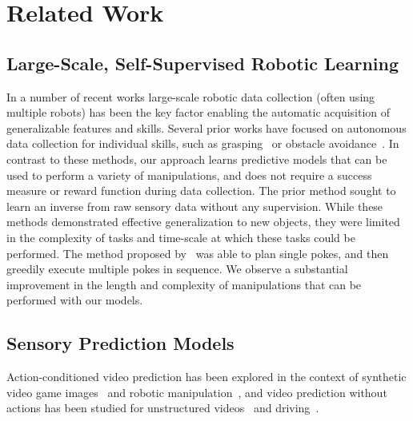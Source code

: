 \section{Related Work}\label{sec:rel_work}

\subsection{Large-Scale, Self-Supervised Robotic Learning}

In a number of recent works large-scale robotic data collection (often using multiple robots) has been the key factor enabling the automatic acquisition of generalizable features and skills. Several prior works have focused on autonomous data collection for individual skills, such as grasping~\cite{lerrel,google_handeye} or obstacle avoidance~\cite{greg_kahn_uncertainty,crashing}. In contrast to these methods, our approach learns predictive models that can be used to perform a variety of manipulations, and does not require a success measure or reward function during data collection. The prior method \cite{pulkit} sought to learn an inverse from raw sensory data without any supervision.
While these methods demonstrated effective generalization to new objects, they were limited in the complexity of tasks and time-scale at which these tasks could be performed. The method proposed by~\cite{pulkit} was able to plan single pokes, and then greedily execute multiple pokes in sequence. We observe a substantial improvement in the length and complexity of manipulations that can be performed with our models.

\subsection{Sensory Prediction Models}

Action-conditioned video prediction has been explored in the context of synthetic video game images~\cite{atarioh,recurrentsimulators} and robotic manipulation~\cite{bootsetal,finn_nips,video_pixel_networks}, and video prediction without actions has been studied for unstructured videos~\cite{beyond_mse,convlstm,vondrick} and driving~\cite{prednet,dynamic_filter_networks}. 


